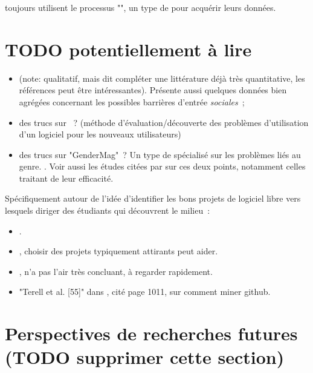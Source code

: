 \textcite[p.~1006]{barriers-2018} toujours utilisent le processus "", un type de  pour acquérir leurs données. 

\section*{TODO potentiellement à lire}

\begin{itemize}
    \item {} (note: qualitatif, mais dit compléter une littérature déjà très
        quantitative, les références peut être intéressantes). Présente aussi quelques données bien agrégées
        concernant les possibles barrières d'entrée \emph{sociales} ;
    \item des trucs sur  ? (méthode  d'évaluation/découverte des
        problèmes d'utilisation d'un logiciel pour les nouveaux utilisateurs)
    \item des trucs sur "GenderMag" ? Un type de  spécialisé sur les problèmes liés
        au genre. . Voir aussi les études citées par
        \textcite[p.~1005-1006]{barriers-2018} sur ces deux points, notamment celles traitant de leur
        efficacité.
\end{itemize}

Spécifiquement autour de l'idée d'identifier les bons projets de logiciel libre vers lesquels diriger des
étudiants qui découvrent le milieu :

\begin{itemize}
    \item {}.
    \item {}, choisir des projets typiquement attirants peut aider.
    \item {}, n'a pas l'air très concluant, à regarder rapidement.
    \item "Terell et al. [55]" dans \textcite{barriers-2018}, cité page 1011, sur comment miner github.
\end{itemize}

\section*{Perspectives de recherches futures (TODO supprimer cette section)}

